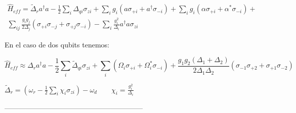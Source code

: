 \begin{multline}
\hat{H}_{eff} = \tilde{\Delta}_r a^\dagger a - \frac{1}{2} \sum\limits_i \Delta_{qi} \sigma_{zi} + \sum\limits_i g_i (a \sigma_{+i} + a^\dagger \sigma_{-i}) + \sum\limits_i g_i (\alpha \sigma_{+i} + \alpha^* \sigma_{-i}) + \\
\sum\limits_{ij} \frac{g_i g_j}{2 \Delta_j} \left(\sigma_{+i} \sigma_{-j} + \sigma_{+j} \sigma_{-i}\right) - \sum\limits_{i} \frac{g_i^2}{\Delta_i} a^\dagger a \sigma_{zi}
\end{multline}




En el caso de dos qubits tenemos:

\begin{equation}
\hat{H}_{eff} \approx \Delta_r a^\dagger a - \frac{1}{2} \sum\limits_i \tilde{\Delta}_{qi} \sigma_{zi} + \sum\limits_i (\Omega_i \sigma_{+i} + \Omega_i^* \sigma_{-i})
+ \frac{g_1 g_2 (\Delta_1 + \Delta_2)}{2 \Delta_1 \Delta_2} (\sigma_{-1} \sigma_{+2}+\sigma_{+1} \sigma_{-2})
\end{equation}

$\tilde{\Delta}_r = (\omega_r - \frac{1}{2} \sum\limits_i \chi_i \sigma_{zi}) - \omega_d \qquad \chi_i = \frac{g_i^2}{\Delta_i}$





-----------------------------------------------------------



